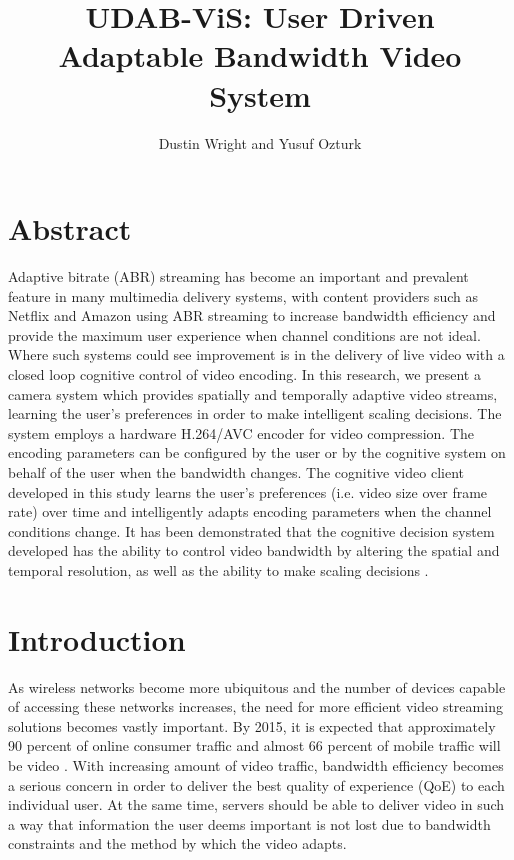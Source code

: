 \documentclass[a4paper,12pt]{article}
\begin{document}
\title{UDAB-ViS: User Driven Adaptable Bandwidth Video System}
\author{Dustin Wright and Yusuf Ozturk}
\maketitle


\section*{Abstract}
Adaptive bitrate (ABR) streaming has become an important and prevalent feature in many multimedia delivery systems, with content providers such as Netflix and Amazon using ABR streaming to increase bandwidth efficiency and provide the maximum user experience when channel conditions are not ideal. Where such systems could see improvement is in the delivery of live video with a closed loop cognitive control of video encoding. In this research, we present a camera system which provides spatially and temporally adaptive video streams, learning the user’s preferences in order to make intelligent scaling decisions. The system employs a hardware H.264/AVC encoder for video compression. The encoding parameters can be configured by the user or by the cognitive system on behalf of the user when the bandwidth changes. The cognitive video client  developed in this study learns the user’s preferences (i.e. video size over frame rate) over time and intelligently adapts  encoding parameters when the channel conditions change. It has been demonstrated that the cognitive decision system developed has  the ability to control video bandwidth by altering the spatial and temporal resolution, as well as the ability to make scaling decisions .


\section{Introduction}
\label{sec:Intro}

As wireless networks become more ubiquitous and the number of devices capable of accessing these networks increases, the need for more efficient video streaming solutions becomes vastly important. By 2015, it is expected that approximately 90 percent of online consumer traffic and almost 66 percent of mobile traffic will be video \cite{HASQoE}. With increasing amount of video traffic, bandwidth efficiency becomes a serious concern in order to deliver the best quality of experience (QoE) to each individual user. At the same time, servers should be able to deliver video in such a way that information the user deems important is not lost due to bandwidth constraints and the method by which the video adapts.
\end{document}
